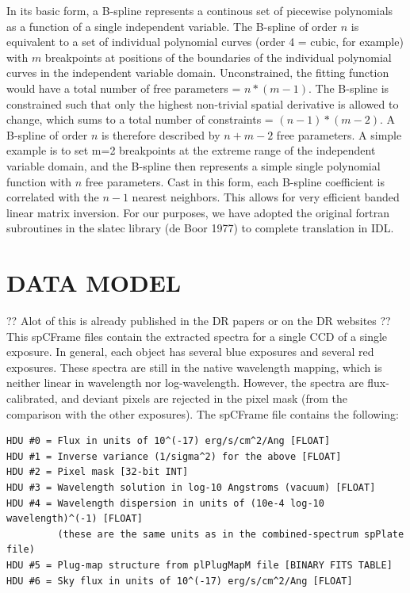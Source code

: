\documentclass[12pt,preprint]{aastex}
\begin{document}
In its basic form, a B-spline represents
a continous set of piecewise polynomials as a function of a single independent
variable.  The B-spline of order $n$ is equivalent to a set 
of individual polynomial curves (order 4 = cubic, for example) with $m$ 
breakpoints at positions of the boundaries of the individual polynomial 
curves in the independent variable domain.  Unconstrained, the fitting function
would have a total number of free parameters = $n * (m-1)$.  The B-spline is
constrained such that only the highest non-trivial spatial derivative is
allowed to change, which sums to a total number of constraints = 
$(n-1) * (m-2)$.  A B-spline of order $n$ is therefore described by 
$n + m - 2$ free parameters.  A simple example is to set m=2 breakpoints at
the extreme range of the independent variable domain, and the B-spline then
represents a simple single polynomial function with $n$ free parameters.
Cast in this form, each B-spline coefficient is correlated with the
$n-1$ nearest neighbors.  This allows for very efficient banded linear matrix
inversion.  For our purposes, we have adopted the original fortran subroutines
in the slatec library (de Boor 1977) to complete translation in IDL.

\section{DATA MODEL}
\label{datamodel}

?? Alot of this is already published in the DR papers or on the DR websites ??
This spCFrame files contain the extracted spectra for a single CCD of a
single exposure. In general, each object has several blue exposures and
several red exposures. These spectra are still in the native wavelength
mapping, which is neither linear in wavelength nor log-wavelength.
However, the spectra are flux-calibrated, and deviant pixels are
rejected in the pixel mask (from the comparison with the other exposures).
The spCFrame file contains the following:
\begin{verbatim}
HDU #0 = Flux in units of 10^(-17) erg/s/cm^2/Ang [FLOAT]
HDU #1 = Inverse variance (1/sigma^2) for the above [FLOAT]
HDU #2 = Pixel mask [32-bit INT]
HDU #3 = Wavelength solution in log-10 Angstroms (vacuum) [FLOAT]
HDU #4 = Wavelength dispersion in units of (10e-4 log-10 wavelength)^(-1) [FLOAT]
         (these are the same units as in the combined-spectrum spPlate file)
HDU #5 = Plug-map structure from plPlugMapM file [BINARY FITS TABLE]
HDU #6 = Sky flux in units of 10^(-17) erg/s/cm^2/Ang [FLOAT]
\end{verbatim}
\end{document}
